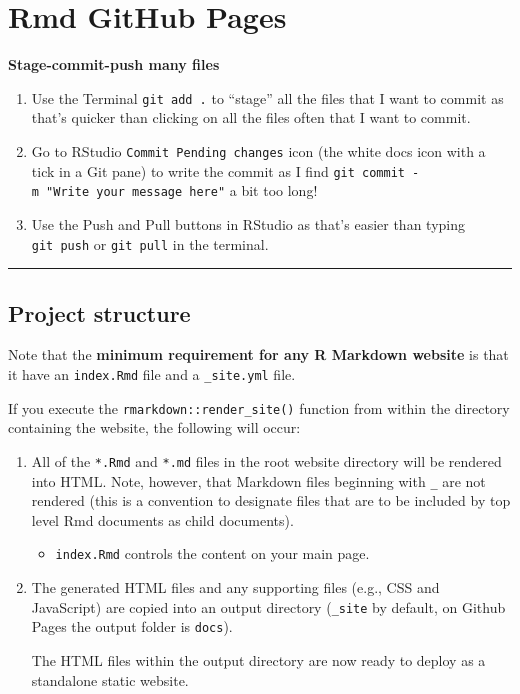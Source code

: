 \documentclass[
  a4paper,
  twoside,
  openright]{book}
\providecommand{\tightlist}{%
  \setlength{\itemsep}{0pt}\setlength{\parskip}{0pt}}
\theoremstyle{definition}
\theoremstyle{definition}
\theoremstyle{definition}
\theoremstyle{definition}
\theoremstyle{remark}
\begin{document}
\section{Rmd GitHub Pages}\label{rmd-github-pages}

\textbf{Stage-commit-push many files}

\begin{enumerate}
\def\labelenumi{\arabic{enumi}.}
\item
  Use the Terminal \texttt{git\ add\ .} to ``stage'' all the files that I want to commit as that's quicker than clicking on all the files often that I want to commit.
\item
  Go to RStudio \texttt{Commit\ Pending\ changes} icon (the white docs icon with a tick in a Git pane) to write the commit as I find \texttt{git\ commit\ -m\ "Write\ your\ message\ here"} a bit too long!
\item
  Use the Push and Pull buttons in RStudio as that's easier than typing \texttt{git\ push} or \texttt{git\ pull} in the terminal.
\end{enumerate}

\begin{center}\rule{0.5\linewidth}{0.5pt}\end{center}

\subsection*{Project structure}\label{project-structure}

Note that the \textbf{minimum requirement for any R Markdown website} is that it have an \texttt{index.Rmd} file and a \texttt{\_site.yml} file.

If you execute the \texttt{rmarkdown::render\_site()} function from within the directory containing the website, the following will occur:

\begin{enumerate}
\def\labelenumi{\arabic{enumi}.}
\item
  All of the \texttt{*.Rmd} and \texttt{*.md} files in the root website directory will be rendered into HTML. Note, however, that Markdown files beginning with \texttt{\_} are not rendered (this is a convention to designate files that are to be included by top level Rmd documents as child documents).

  \begin{itemize}
  \tightlist
  \item
    \texttt{index.Rmd} controls the content on your main page.
  \end{itemize}
\item
  The generated HTML files and any supporting files (e.g., CSS and JavaScript) are copied into an output directory (\texttt{\_site} by default, on Github Pages the output folder is \texttt{docs}).

  The HTML files within the output directory are now ready to deploy as a standalone static website.
\end{enumerate}
\end{document}
